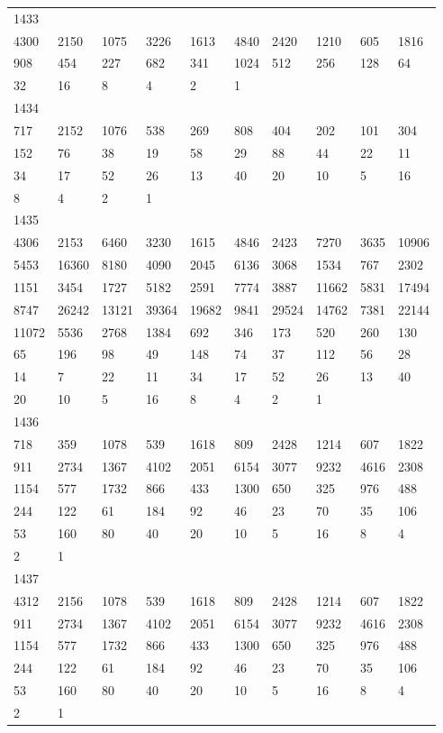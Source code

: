\begin{longtable}{*{10}{l}}
1433&&&&&&&&&\\
4300& 2150& 1075& 3226& 1613& 4840& 2420& 1210& 605& 1816\\
908& 454& 227& 682& 341& 1024& 512& 256& 128& 64\\
32& 16& 8& 4& 2& 1& \\

1434&&&&&&&&&\\
717& 2152& 1076& 538& 269& 808& 404& 202& 101& 304\\
152& 76& 38& 19& 58& 29& 88& 44& 22& 11\\
34& 17& 52& 26& 13& 40& 20& 10& 5& 16\\
8& 4& 2& 1& \\

1435&&&&&&&&&\\
4306& 2153& 6460& 3230& 1615& 4846& 2423& 7270& 3635& 10906\\
5453& 16360& 8180& 4090& 2045& 6136& 3068& 1534& 767& 2302\\
1151& 3454& 1727& 5182& 2591& 7774& 3887& 11662& 5831& 17494\\
8747& 26242& 13121& 39364& 19682& 9841& 29524& 14762& 7381& 22144\\
11072& 5536& 2768& 1384& 692& 346& 173& 520& 260& 130\\
65& 196& 98& 49& 148& 74& 37& 112& 56& 28\\
14& 7& 22& 11& 34& 17& 52& 26& 13& 40\\
20& 10& 5& 16& 8& 4& 2& 1& \\

1436&&&&&&&&&\\
718& 359& 1078& 539& 1618& 809& 2428& 1214& 607& 1822\\
911& 2734& 1367& 4102& 2051& 6154& 3077& 9232& 4616& 2308\\
1154& 577& 1732& 866& 433& 1300& 650& 325& 976& 488\\
244& 122& 61& 184& 92& 46& 23& 70& 35& 106\\
53& 160& 80& 40& 20& 10& 5& 16& 8& 4\\
2& 1& \\

1437&&&&&&&&&\\
4312& 2156& 1078& 539& 1618& 809& 2428& 1214& 607& 1822\\
911& 2734& 1367& 4102& 2051& 6154& 3077& 9232& 4616& 2308\\
1154& 577& 1732& 866& 433& 1300& 650& 325& 976& 488\\
244& 122& 61& 184& 92& 46& 23& 70& 35& 106\\
53& 160& 80& 40& 20& 10& 5& 16& 8& 4\\
2& 1& \\


\end{longtable}
